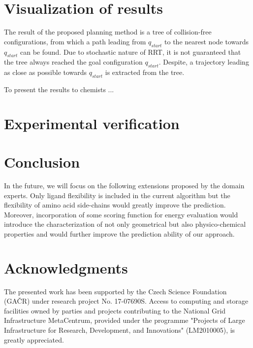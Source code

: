 \documentclass{svmult}
\def\qstart{q_{start}}
\def\qinit{\qstart}
\def\qgoal{\qstart}
\begin{document}
\section{Visualization of results}

The result of the proposed planning method is a tree of collision-free configurations, from which a path leading from $\qinit$
to the nearest node towards $\qgoal$ can be found.
Due to stochastic nature of RRT, it is not guaranteed that the tree always reached the goal configuration $\qgoal$.
Despite, a trajectory leading as close as possible towards $\qgoal$ is extracted from the tree.

To present the results to chemists ...

\section{Experimental verification}



\section{Conclusion }
In the future, we will focus on the following extensions proposed by the domain experts.
Only ligand flexibility is included in the current algorithm but the flexibility of amino acid side-chains would greatly improve the prediction. 
Moreover, incorporation of some scoring function for energy evaluation would introduce the characterization of not only geometrical but also physico-chemical properties and would further improve the prediction ability of our approach.

\section{Acknowledgments}

The presented work has been supported by the Czech Science Foundation (GA{\v C}R) under research project No. 17-07690S.
Access to computing and storage facilities owned by parties and projects contributing to the National Grid Infrastructure MetaCentrum, provided under the programme "Projects of Large Infrastructure for Research, Development, and Innovations" (LM2010005), is greatly appreciated.




\end{document}
